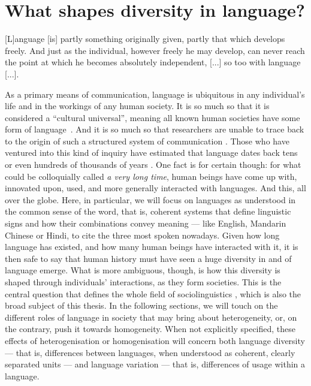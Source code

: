 \documentclass[../thesis.tex]{subfiles}
\begin{document}
\chapter{What shapes diversity in language?} %
\label{ch:origins_lang_diversity}
 
\epigraph{
  [L]anguage [is] partly something originally given, partly that which develops
  freely. And just as the individual, however freely he may develop, can never reach the
  point at which he becomes absolutely independent, [...]
  so too with language [...].
 }{
}

As a primary means of communication, language is ubiquitous in any individual's life and
in the workings of any human society. It is so much so that it is considered a
``cultural universal'', meaning all known human societies have some form of
language~\cite{GreenbergLanguageUniversals2020,BrownHumanUniversals1991}. And it
is so much so that researchers are unable to trace back to the origin of such a
structured system of communication
\cite{MullerLectureIX1861,StamInquiriesOrigin1976,GibsonOxfordHandbook2011,HauserMysteryLanguage2014}.
Those who have ventured into this kind of inquiry have estimated that language dates
back tens or even hundreds of thousands of years
\cite{NicholsOriginDispersal1998,ChomskyLanguageMind2004,BothaCradleLanguage2009,DediuAntiquityLanguage2013}.
One fact is for certain though: for what could be colloquially called \emph{a very long
time}, human beings have come up with, innovated upon, used, and more generally
interacted with languages. And this, all over the globe. Here, in particular, we will
focus on languages as understood in the common sense of the word, that is, coherent
systems that define linguistic signs and how their combinations convey meaning --- like
English, Mandarin Chinese or Hindi, to cite the three most spoken nowadays. Given how
long language has existed, and how many human beings have interacted with it, it is then
safe to say that human history must have seen a huge diversity in and of language
emerge. What is more ambiguous, though, is how this diversity is shaped through
individuals' interactions, as they form societies. This is the central question that
defines the whole field of sociolinguistics
\cite{LabovSociolinguisticPatterns1973,TrudgillSociolinguisticsIntroduction2000,ChambersSociolinguisticTheory2007,WardhaughIntroductionSociolinguistics2008,LabovPrinciplesLinguistic2001},
which is also the broad subject of this thesis. In the following sections, we will touch
on the different roles of language in society that may bring about heterogeneity, or, on
the contrary, push it towards homogeneity. When not explicitly specified, these effects
of heterogenisation or homogenisation will concern both language diversity --- that is,
differences between languages, when understood as coherent, clearly separated units --- and
language variation --- that is, differences of usage within a language.
\end{document}
